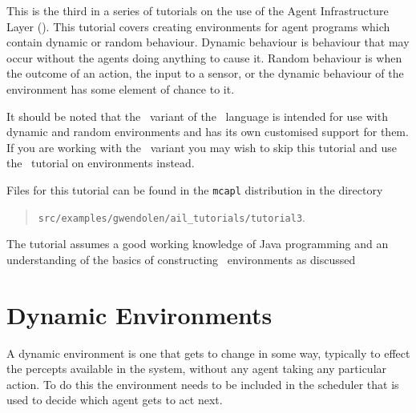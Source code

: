 \label{tutorial:ail:environments}

This is the third in a series of tutorials on the use of the Agent Infrastructure Layer (\ail).  This tutorial covers creating environments for agent programs which contain dynamic or random behaviour.   Dynamic behaviour is behaviour that may occur without the agents doing anything to cause it.  Random behaviour is when the outcome of an action, the input to a sensor, or the dynamic behaviour of the environment has some element of chance to it.

It should be noted that the \eass\ variant of the \gwendolen\ language is intended for use with dynamic and random environments and has its own customised support for them.  If you are working with the \eass\ variant you may wish to skip this tutorial and use the \eass\ tutorial on environments instead.

Files for this tutorial can be found in the \texttt{mcapl} distribution in the directory 
\begin{quote}
\texttt{src/examples/gwendolen/ail\_tutorials/tutorial3}.
\end{quote}

The tutorial assumes a good working knowledge of Java programming and an understanding of the basics of constructing \ail\ environments as discussed 

\section{Dynamic Environments}

A dynamic environment is one that gets to change in some way, typically to effect the percepts available in the system, without any agent taking any particular action.  To do this the environment needs to be included in the scheduler that is used to decide which agent gets to act next.

